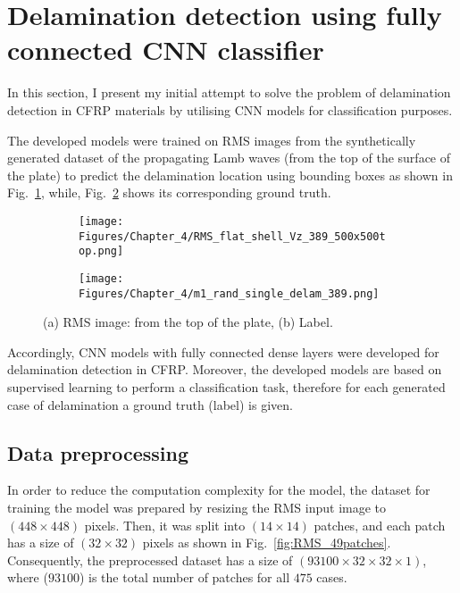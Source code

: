 \section{Delamination detection using fully connected CNN classifier}
\label{sec42}

In this section, I present my initial attempt to solve the problem of delamination detection in CFRP materials by utilising CNN models for classification purposes.

The developed models were trained on RMS images from the synthetically generated dataset of the propagating Lamb waves (from the top of the surface of the plate) to predict the delamination location using bounding boxes as shown in Fig.~\ref{fig:RMS_14}, while, Fig.~\ref{fig:label_14} shows its corresponding ground truth.
\begin{figure} [!ht]
	\centering
	\begin{subfigure}[b]{0.47\textwidth}
		\centering
		\texttt{[image: Figures/Chapter\_4/RMS\_flat\_shell\_Vz\_389\_500x500top.png]}
		\caption{}
		\label{fig:RMS_14}
	\end{subfigure}
	\hfill
	\begin{subfigure}[b]{0.47\textwidth}
		\centering
		\texttt{[image: Figures/Chapter\_4/m1\_rand\_single\_delam\_389.png]}
		\caption{}
		\label{fig:label_14}
	\end{subfigure}
	\caption{(a) RMS image: from the top of the plate, (b) Label.}
	\label{fig:RMS_GT}
\end{figure} 

Accordingly, CNN models with fully connected dense layers were developed for delamination detection in CFRP.
Moreover, the developed models are based on supervised learning to perform a classification task, therefore for each generated case of delamination a ground truth (label) is given.
 
\subsection{Data preprocessing}
\label{sec421}
In order to reduce the computation complexity for the model, the dataset for training the model was prepared by resizing the RMS input image to \((448\times 448)\) pixels.  
Then, it was split into \((14\times 14)\) patches, and each patch has a size of \((32\times 32)\) pixels as shown in Fig.~\ref{fig:RMS_49patches}.
Consequently, the preprocessed dataset has a size of \((93100\times 32\times 32 \times 1)\), where (\(93100\)) is the total number of patches for all \(475\) cases.

